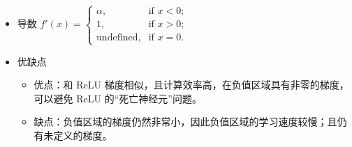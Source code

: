 \documentclass[8pt]{article}
\begin{document}
\begin{enumerate}
    \begin{itemize}
        \item 导数 $f'(x) = \begin{cases}
            \alpha, & \text{if } x < 0; \\
            1, & \text{if } x > 0; \\
            \text{undefined}, & \text{if } x = 0.
        \end{cases}$
        \item 优缺点
        \begin{itemize}
            \item 优点：和 ReLU 梯度相似，且计算效率高，在负值区域具有非零的梯度，可以避免 ReLU 的“死亡神经元”问题。
            \item 缺点：负值区域的梯度仍然非常小，因此负值区域的学习速度较慢；且仍有未定义的梯度。
        \end{itemize}
    \end{itemize}

\end{enumerate}
\end{document}
